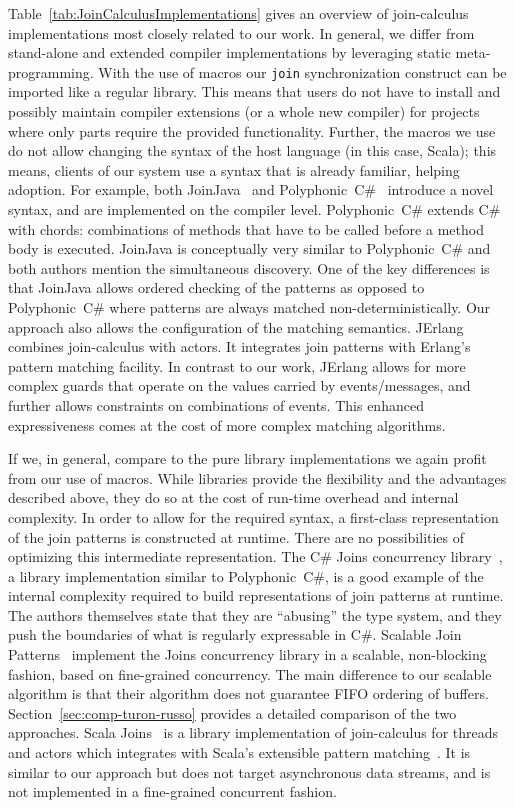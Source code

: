 \documentclass[runningheads]{llncs}
\begin{document}
\begin{sloppypar}
Table~\ref{tab:JoinCalculusImplementations} gives an overview of join-calculus
implementations most closely related to our work.
In general, we differ from stand-alone and extended compiler implementations
by leveraging static meta-programming. With the use of macros our \verb|join| synchronization construct
can be imported like a regular library. This means that users do not have to
install and possibly maintain compiler extensions (or a whole new compiler)
for projects where only parts require the provided functionality. Further, the
macros we use do not allow changing the syntax of the host language (in this case, Scala);
this means, clients of our system use a syntax that is already familiar, helping adoption.
For example, both
JoinJava~\cite{Itzstein:2001} and Polyphonic~C\#~\cite{Benton:2004} introduce
a novel syntax, and are implemented on the compiler level. Polyphonic~C\#
extends C\# with chords: combinations of methods that have to be called before
a method body is executed. JoinJava is conceptually very similar to
Polyphonic~C\# and both authors mention the simultaneous discovery. One of the key
differences is that JoinJava allows ordered checking of the patterns as
opposed to Polyphonic~C\# where patterns are always matched non-deterministically.
Our approach also allows the configuration of the matching
semantics. JErlang~\cite{Plociniczak:2010} combines join-calculus with actors.
It integrates join patterns with Erlang's pattern matching facility. In contrast to our
work, JErlang allows for more complex guards that operate on the values
carried by events/messages, and further allows constraints on combinations of
events. This enhanced expressiveness comes at the cost of more complex matching
algorithms.

If we, in general, compare to the pure library implementations we again profit
from our use of macros. While libraries provide the flexibility and
the advantages described above, they do so at the cost of run-time overhead and
internal complexity. In order to allow for the required syntax, a first-class
representation of the join patterns is constructed at runtime. There are no
possibilities of optimizing this intermediate representation. The C\# Joins
concurrency library~\cite{Russo:2007}, a library implementation similar to
Polyphonic~C\#, is a good example of the internal complexity required to build
representations of join patterns at runtime. The authors themselves state that they are
``abusing'' the type system, and they push the boundaries of what is regularly
expressable in C\#. Scalable Join Patterns~\cite{Turon:2011} implement the Joins concurrency
library in a scalable, non-blocking fashion, based on fine-grained concurrency. The main
difference to our scalable algorithm is that their algorithm does not
guarantee FIFO ordering of buffers. Section~\ref{sec:comp-turon-russo} provides a detailed comparison
of the two approaches. Scala Joins~\cite{Haller:2008} is a library
implementation of join-calculus for threads and actors which integrates with Scala's
extensible pattern matching~\cite{EmirOW07}. It is similar to our approach but does not target
asynchronous data streams, and is not implemented in a fine-grained concurrent fashion.


\end{sloppypar}
\end{document}
